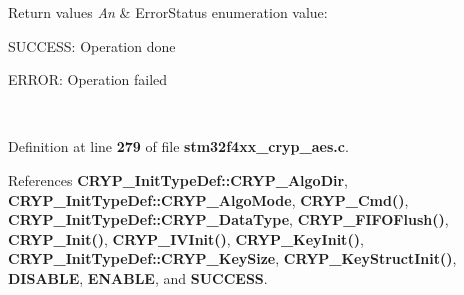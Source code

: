 \begin{DoxyRetVals}{Return values}
{\em An} & Error\+Status enumeration value\+:
\begin{DoxyItemize}
\item S\+U\+C\+C\+E\+SS\+: Operation done
\item E\+R\+R\+OR\+: Operation failed 
\end{DoxyItemize}\\
\hline
\end{DoxyRetVals}


Definition at line \textbf{ 279} of file \textbf{ stm32f4xx\+\_\+cryp\+\_\+aes.\+c}.



References \textbf{ C\+R\+Y\+P\+\_\+\+Init\+Type\+Def\+::\+C\+R\+Y\+P\+\_\+\+Algo\+Dir}, \textbf{ C\+R\+Y\+P\+\_\+\+Init\+Type\+Def\+::\+C\+R\+Y\+P\+\_\+\+Algo\+Mode}, \textbf{ C\+R\+Y\+P\+\_\+\+Cmd()}, \textbf{ C\+R\+Y\+P\+\_\+\+Init\+Type\+Def\+::\+C\+R\+Y\+P\+\_\+\+Data\+Type}, \textbf{ C\+R\+Y\+P\+\_\+\+F\+I\+F\+O\+Flush()}, \textbf{ C\+R\+Y\+P\+\_\+\+Init()}, \textbf{ C\+R\+Y\+P\+\_\+\+I\+V\+Init()}, \textbf{ C\+R\+Y\+P\+\_\+\+Key\+Init()}, \textbf{ C\+R\+Y\+P\+\_\+\+Init\+Type\+Def\+::\+C\+R\+Y\+P\+\_\+\+Key\+Size}, \textbf{ C\+R\+Y\+P\+\_\+\+Key\+Struct\+Init()}, \textbf{ D\+I\+S\+A\+B\+LE}, \textbf{ E\+N\+A\+B\+LE}, and \textbf{ S\+U\+C\+C\+E\+SS}.


